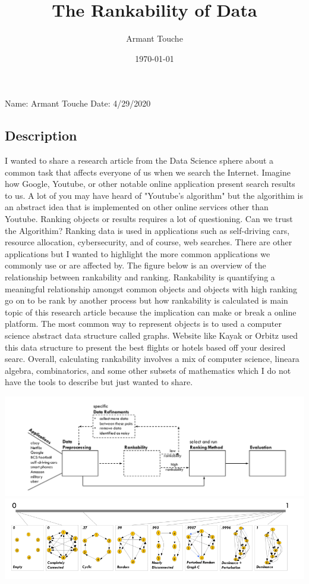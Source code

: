 \documentclass[a4paper,man,biblatex]{apa6}
\title{The Rankability of Data}
\author{Armant Touche}
\affiliation{Portland State University}
\date{\today}
\begin{document}
\thispagestyle{otherpage}
\setcounter{biburllcpenalty}{7000}
\setcounter{biburlucpenalty}{8000}


\noindent Name: Armant Touche\newline
\noindent Date: 4/29/2020

\subsection{Description} I wanted to share a research article from the Data Science sphere about a common task that affects everyone of us when we search the Internet. Imagine how Google, Youtube, or other notable online application present search results to us. A lot of you may have heard of "Youtube's algorithm" but the algorithim is an abstract idea that is implemented on other online services other than Youtube. Ranking objects or results requires a lot of questioning. Can we trust the Algorithim? Ranking data is used in applications such as self-driving cars, resource allocation, cybersecurity, and of course, web searches. There are other applications but I wanted to highlight the more common applications we commonly use or are affected by. The figure below is an overview of the relationship between rankability and ranking. Rankability is quantifying a meaningful relationship amongst common objects and objects with high ranking go on to be rank by another process but how rankability is calculated is main topic of this research article because the implication can make or break a online platform. The most common way to represent objects is to used a computer science abstract data structure called graphs. Website like Kayak or Orbitz used this data structure to present the best flights or hotels based off your desired searc. Overall, calculating rankability involves a mix of computer science, lineara algebra, combinatorics, and some other subsets of mathematics which I do not have the tools to describe but just wanted to share.


\includegraphics[width=.75\linewidth]{data_pipe}
\includegraphics[width=.75\linewidth]{ranking}
\end{document}
